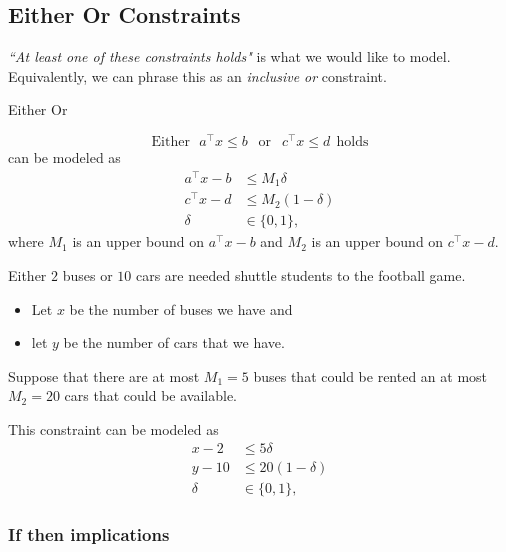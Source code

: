 \documentclass[../open-optimization/open-optimization.tex]{subfiles}
\begin{document}
\subsection{Either Or Constraints}
\emph{``At least one of these constraints holds"} is what we would like to model.  Equivalently, we can phrase this as an \emph{inclusive or} constraint.  
\begin{general}{Either Or}{}{}

\begin{equation}
\text{Either} \ \ \ a^\top x \leq b\ \  \text{  or  } \ \  c^\top x \leq d \ \ \text{holds} 
\end{equation}
can be modeled as 
\begin{equation}
\begin{split}
a^\top x - b &\leq M_1 \delta\\
c^\top x - d &\leq M_2 (1-\delta)\\
\delta &\in \{0,1\},
\end{split}
\end{equation}
where $M_1$ is an upper bound on $a^\top x - b$ and $M_2$ is an upper bound on $c^\top x - d$.
\end{general}

\begin{example}{}{}
Either $2$ buses or $10$ cars are needed shuttle students to the football game.  
\begin{itemize}
\item Let $x$ be the number of buses we have and 
\item let $y$ be the number of cars that we have.  
\end{itemize}
Suppose that there are at most $M_1 = 5$ buses that could be rented an at most $M_2 = 20$ cars that could be available.

This constraint can be modeled as 
\begin{equation}
\begin{split}
x - 2 &\leq 5\delta\\
y - 10 &\leq 20 (1-\delta)\\
\delta &\in \{0,1\},
\end{split}
\end{equation}
\end{example}
\subsubsection{If then implications}
\end{document}
